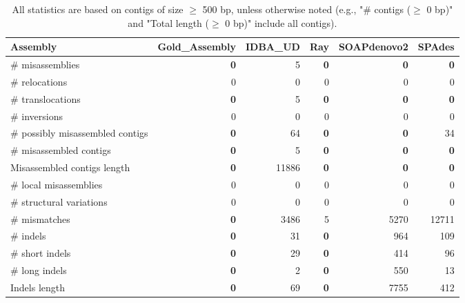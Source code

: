 \documentclass[12pt,a4paper]{article}
\begin{document}
\begin{table}[ht]
\begin{center}
\caption{All statistics are based on contigs of size $\geq$ 500 bp, unless otherwise noted (e.g., "\# contigs ($\geq$ 0 bp)" and "Total length ($\geq$ 0 bp)" include all contigs).}
\begin{tabular}{|l*{5}{|r}|}
\hline
Assembly & Gold\_Assembly & IDBA\_UD & Ray & SOAPdenovo2 & SPAdes \\ \hline
\# misassemblies & {\bf 0} & 5 & {\bf 0} & {\bf 0} & {\bf 0} \\ \hline
\hspace{5mm}\# relocations & 0 & 0 & 0 & 0 & 0 \\ \hline
\hspace{5mm}\# translocations & {\bf 0} & 5 & {\bf 0} & {\bf 0} & {\bf 0} \\ \hline
\hspace{5mm}\# inversions & 0 & 0 & 0 & 0 & 0 \\ \hline
\# possibly misassembled contigs & {\bf 0} & 64 & {\bf 0} & {\bf 0} & 34 \\ \hline
\# misassembled contigs & {\bf 0} & 5 & {\bf 0} & {\bf 0} & {\bf 0} \\ \hline
Misassembled contigs length & {\bf 0} & 11886 & {\bf 0} & {\bf 0} & {\bf 0} \\ \hline
\# local misassemblies & 0 & 0 & 0 & 0 & 0 \\ \hline
\# structural variations & 0 & 0 & 0 & 0 & 0 \\ \hline
\# mismatches & {\bf 0} & 3486 & 5 & 5270 & 12711 \\ \hline
\# indels & {\bf 0} & 31 & {\bf 0} & 964 & 109 \\ \hline
\hspace{5mm}\# short indels & {\bf 0} & 29 & {\bf 0} & 414 & 96 \\ \hline
\hspace{5mm}\# long indels & {\bf 0} & 2 & {\bf 0} & 550 & 13 \\ \hline
Indels length & {\bf 0} & 69 & {\bf 0} & 7755 & 412 \\ \hline
\end{tabular}
\end{center}
\end{table}
\end{document}
